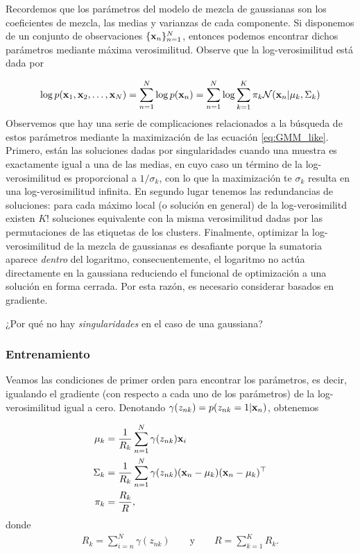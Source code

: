 Recordemos que los parámetros del modelo de mezcla de gaussianas son los coeficientes de mezcla, las medias y varianzas de cada componente. Si disponemos de un conjunto de observaciones $\{\mathbf{x}_n\}_{n=1}^N$, entonces podemos encontrar dichos parámetros mediante máxima verosimilitud. Observe que la log-verosimilitud está dada por 

\begin{equation}
	\log p(\mathbf{x}_1,\mathbf{x}_2,\ldots,\mathbf{x}_N) = \sum_{n=1}^N \log p(\mathbf{x}_n) = \sum_{n=1}^N \log \sum_{k=1}^K  \pi_k{\mathcal N}(\mathbf{x}_n|\mu_k,\Sigma_k) \label{eq:GMM_like}	
\end{equation}
Observemos que hay una serie de complicaciones relacionados a la búsqueda de estos parámetros mediante la maximización de las ecuación \eqref{eq:GMM_like}. Primero, están las soluciones dadas por singularidades cuando una muestra es exactamente igual a una de las medias, en cuyo caso un término de la log-verosimilitud es proporcional a $1/\sigma_k$, con lo que la maximización te $\sigma_k$ resulta en una log-verosimilitud infinita. En segundo lugar tenemos las redundancias de soluciones: para cada máximo local (o solución en general) de la log-verosimilitd existen $K!$ soluciones equivalente con la misma verosimilitud dadas por las permutaciones de las etiquetas de los clusters. Finalmente, optimizar la log-verosimilitud de la mezcla de gaussianas es desafiante porque la sumatoria aparece \emph{dentro} del logaritmo, consecuentemente,  el logaritmo no actúa directamente en la gaussiana reduciendo el funcional de optimización a una solución en forma cerrada. Por esta razón, es necesario considerar basados en gradiente.

\begin{mdframed}[style=pendiente, frametitle={\center discusión}]
¿Por qué no hay \emph{singularidades} en el caso de una gaussiana?
\end{mdframed}


\subsubsection{Entrenamiento} 
\label{sub:GMM_train}

Veamos las condiciones de primer orden para encontrar los parámetros, es decir, igualando el gradiente (con respecto a cada uno de los parámetros) de la log-verosimilitud igual a cero. Denotando $\gamma(z_{nk}) = p(z_{nk}=1|\mathbf{x}_n)$, obtenemos

 
    \begin{align}
    \mu_k & = \frac{1}{R_k}\sum_{n=1}^N \gamma(z_{nk})\mathbf{x}_i\\
    \Sigma_k & = \frac{1}{R_k} \sum_{n=1}^N \gamma(z_{nk})(\mathbf{x}_n - \mu_k)(\mathbf{x}_n - \mu_k)^\top\\
    \pi_k & = \frac{R_k}{R},
    \end{align}
    donde
    \begin{align*}
    R_k = \sum_{i=n}^N \gamma(z_{nk}) \qquad \text{y} \qquad R = \sum_{k=1}^K R_k.
    \end{align*}

